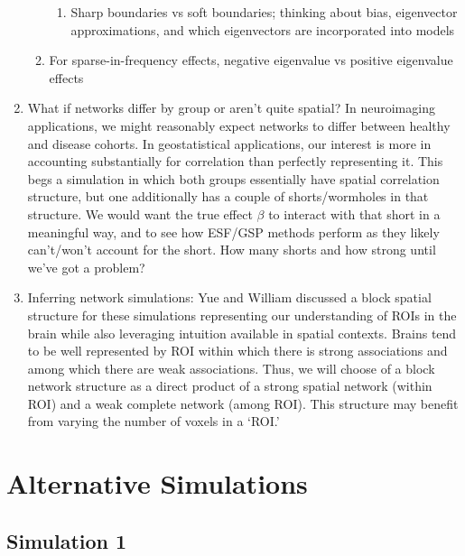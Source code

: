\documentclass[12pt]{article}
\begin{document}
\begin{enumerate}
\begin{enumerate}
\begin{enumerate}
			            \item Sharp boundaries vs soft boundaries; thinking about bias, eigenvector approximations, and which eigenvectors are incorporated into models
		            \end{enumerate}
		      \item For sparse-in-frequency effects, negative eigenvalue vs positive eigenvalue effects
	      \end{enumerate}
	\item What if networks differ by group or aren't quite spatial? In neuroimaging applications, we might reasonably expect networks to differ between healthy and disease cohorts. In geostatistical applications, our interest is more in accounting substantially for correlation than perfectly representing it. This begs a simulation in which both groups essentially have spatial correlation structure, but one additionally has a couple of shorts/wormholes in that structure. We would want the true effect $\beta$ to interact with that short in a meaningful way, and to see how ESF/GSP methods perform as they likely can't/won't account for the short. How many shorts and how strong until we've got a problem?
	\item Inferring network simulations: Yue and William discussed a block spatial structure for these simulations representing our understanding of ROIs in the brain while also leveraging intuition available in spatial contexts. Brains tend to be well represented by ROI within which there is strong associations and among which there are weak associations. Thus, we will choose of a block network structure as a direct product of a strong spatial network (within ROI) and a weak complete network (among ROI). This structure may benefit from varying the number of voxels in a `ROI.'
\end{enumerate}

\newpage

\section*{Alternative Simulations}

\subsection*{Simulation 1}
\end{document}
